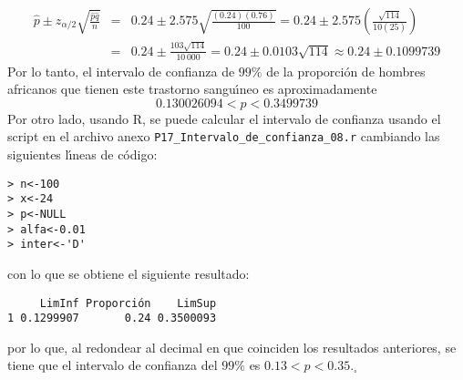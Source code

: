 \begin{solucion}
\begin{enumerate}
\begin{eqnarray*}
   \hat{p} \pm z_{\alpha/2}\sqrt{\frac{\hat{p}\hat{q}}{n}} & = & 0.24 \pm 2.575\sqrt{\frac{(0.24)(0.76)}{100}} = 0.24 \pm 2.575\left( \frac{\sqrt{114}}{10(25)} \right) \\
   & = & 0.24 \pm \frac{103\sqrt{114}}{10\,000} = 0.24 \pm 0.0103\sqrt{114} \approx 0.24 \pm 0.1099739
  \end{eqnarray*}
  Por lo tanto, el intervalo de confianza de $99\%$ de la proporci\'on de hombres africanos que tienen este trastorno sangu\'{\i}neo es aproximadamente
  \begin{equation*}
   0.130026094 < p <
   0.3499739
  \end{equation*}
  Por otro lado, usando R, se puede calcular el intervalo de confianza usando el script en el archivo anexo \texttt{P17\_Intervalo\_de\_confianza\_08.r} cambiando las siguientes l\'{\i}neas de c\'odigo:
  \begin{verbatim}
> n<-100
> x<-24
> p<-NULL
> alfa<-0.01
> inter<-'D'
  \end{verbatim}
  \vspace{-0.5cm}
  con lo que se obtiene el siguiente resultado:
  \begin{verbatim}
     LimInf Proporción    LimSup
1 0.1299907       0.24 0.3500093
  \end{verbatim}
  \vspace{-0.5cm}
  por lo que, al redondear al decimal en que coinciden los resultados anteriores, se tiene que el intervalo de confianza del $99\%$ es $0.13 < p < 0.35$.${}_{\square}$
  

\end{enumerate}
\end{solucion}
